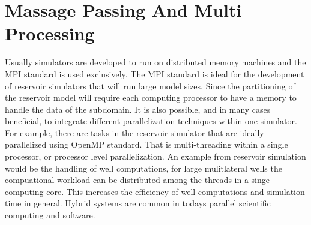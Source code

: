 \documentclass[barcolor=BrickRed,nocopyright,nolists]{asmejour}
\begin{document}
\section{Massage Passing And Multi Processing}
Usually simulators are developed to run on distributed memory machines and the MPI standard is used exclusively. The MPI standard is ideal for the development of reservoir simulators that will run large model sizes. Since the partitioning of the reservoir model will require each computing processor to have a memory to handle the data of the subdomain.
It is also possible, and in many cases beneficial, to integrate different parallelization techniques within one simulator. For example, there are tasks in the reservoir simulator that are ideally parallelized using OpenMP standard. That is multi-threading within a single processor, or processor level parallelization. An example from reservoir simulation
would be the handling of well computations, for large mulitlateral wells the compuational workload can be distributed among the threads in a singe computing core. This increases the efficiency of well computations and simulation time in general. Hybrid systems are common in todays parallel scientific computing and software.

\end{document}
